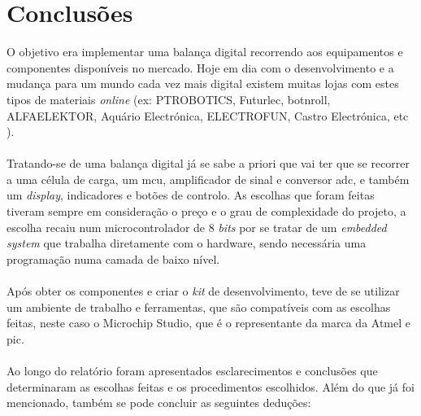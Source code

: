 \chapter{Conclusões}
O objetivo era implementar uma balança digital recorrendo aos equipamentos e componentes disponíveis no mercado. Hoje em dia com o desenvolvimento e a mudança para um mundo cada vez mais digital existem muitas lojas com estes tipos de materiais \textit{online} (ex: PTROBOTICS, Futurlec, botnroll, ALFAELEKTOR, Aquário Electrónica, ELECTROFUN, Castro Electrónica, etc ).
\\
\\
Tratando-se de uma balança digital já se sabe a priori que vai ter que se recorrer a uma célula de carga, um \acs{mcu}, amplificador de sinal e conversor \acs{adc}, e também um \textit{display}, indicadores e botões de controlo. As escolhas que foram feitas tiveram sempre em consideração o preço e o grau de complexidade do projeto, a escolha recaiu num microcontrolador de 8 \textit{bits} por se tratar de um \textit{embedded system} que trabalha diretamente com o hardware, sendo necessária uma programação numa camada de baixo nível.
\\
\\
Após obter os componentes e criar o \textit{kit} de desenvolvimento, teve de se utilizar um ambiente de trabalho e ferramentas, que são compatíveis com as escolhas feitas, neste caso o Microchip Studio, que é o representante da marca da Atmel e \acs{pic}.
\\
\\
Ao longo do relatório foram apresentados esclarecimentos e conclusões que determinaram as escolhas feitas e os procedimentos escolhidos. Além do que já foi mencionado, também se pode concluir as seguintes deduções:
\\
\\
